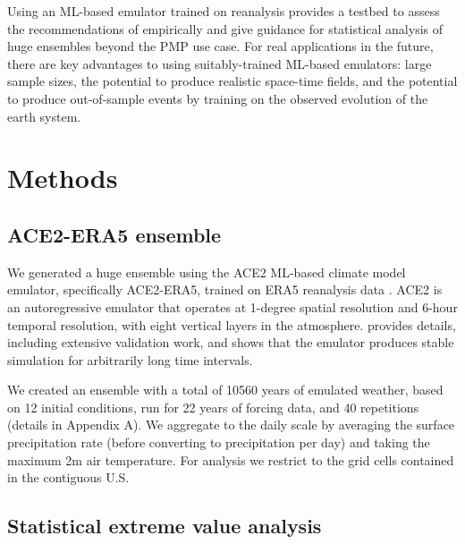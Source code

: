\documentclass{ametsocV6.1}
\begin{document}
  Using an ML-based emulator trained on reanalysis provides a testbed to assess the recommendations of \citet{nasem2024pmp} empirically and give guidance for statistical analysis of huge ensembles beyond the PMP use case.
For real applications in the future, there are key advantages to using suitably-trained ML-based emulators:  large sample sizes, the potential to produce realistic space-time fields, and the potential to produce out-of-sample events by training on the observed evolution of the earth system.

\section{Methods}

\subsection{ACE2-ERA5 ensemble}

We generated a huge ensemble using the ACE2 ML-based climate model emulator, specifically ACE2-ERA5, trained on ERA5 reanalysis data \citep{watt2025ace2}. ACE2 is an autoregressive emulator that operates at 1-degree spatial resolution and 6-hour temporal resolution, with eight vertical layers in the atmosphere. \cite{watt2025ace2} provides details, including extensive validation work, and shows that the emulator produces stable simulation for arbitrarily long time intervals.

We created an ensemble with a total of 10560 years of emulated weather, based on 12 initial conditions, run for 22 years of forcing data, and 40 repetitions (details in Appendix A). We aggregate to the daily scale by averaging the surface precipitation rate (before converting to precipitation per day) and taking the maximum 2m air temperature. For analysis we restrict to the grid cells contained in the contiguous U.S. 

\subsection{Statistical extreme value analysis}

\end{document}
